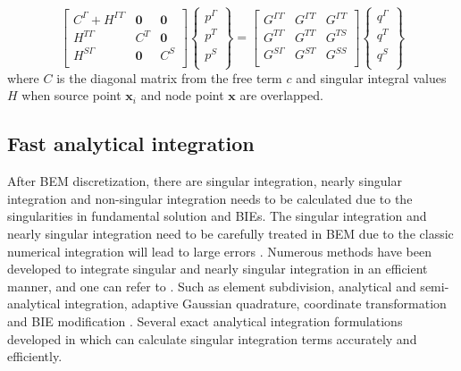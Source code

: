 \documentclass[num-refs]{wiley-networks}
\begin{document}
\begin{equation}
    \left[ \begin{matrix}
    	C^{\Gamma}+H^{\Gamma \Gamma}&		\mathbf{0}&		\mathbf{0}\\
    	H^{T\Gamma}&		C^T&		\mathbf{0}\\
    	H^{S\Gamma}&		\mathbf{0}&		C^S\\
    \end{matrix} \right] \left\{ \begin{array}{c}
    	p^{\Gamma}\\
    	p^T\\
    	p^S\\
    \end{array} \right\} =\left[ \begin{matrix}
    	G^{\Gamma \Gamma}&		G^{\Gamma T}&		G^{\Gamma T}\\
    	G^{T\Gamma}&		G^{TT}&		G^{TS}\\
    	G^{S\Gamma}&		G^{ST}&		G^{SS}\\
    \end{matrix} \right] \left\{ \begin{array}{c}
    	q^{\Gamma}\\
    	q^T\\
    	q^S\\
    \end{array} \right\} 
\end{equation}
where $C$ is the diagonal matrix from the free term $c$ and singular integral values $H$ when source point $\mathbf{x}_i$ and node point $\mathbf{x}$ are overlapped.  

\subsection{Fast analytical integration}
After BEM discretization, there are singular integration, nearly singular integration and non-singular integration needs to be calculated due to the singularities in fundamental solution and BIEs. The singular integration and nearly singular integration need to be carefully treated in BEM due to the classic numerical integration will lead to large errors \cite{katsikadelisBook2016}. Numerous methods have been developed to integrate singular and nearly singular integration in an efficient manner, and one can refer to \cite{LiuYJBook2006,tanaka1994}. Such as element subdivision, analytical and semi-analytical integration, adaptive Gaussian quadrature, coordinate transformation and BIE modification \cite{gu2016Singular}. Several exact analytical integration formulations developed in \cite{fratantonio2000exact,zhang2003exact,zhang2008exact} which can calculate singular integration terms accurately and efficiently. 
\end{document}
